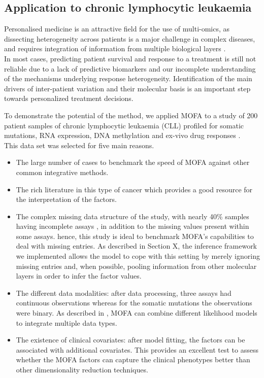 \subsection{Application to chronic lymphocytic leukaemia} \label{section:mofa_cll}
Personalised medicine is an attractive field for the use of multi-omics, as dissecting heterogeneity across patients is a major challenge in complex diseases, and requires integration of information from multiple biological layers \cite{Chen2013,Costello2014,Alyass2015}.\\
In most cases, predicting patient survival and response to a treatment is still not reliable due to a lack of predictive biomarkers and our incomplete understanding of the mechanisms underlying response heterogeneity. Identification of the main drivers of inter-patient variation and their molecular basis is an important step towards personalized treatment decisions. 

To demonstrate the potential of the method, we applied MOFA to a study of 200 patient samples of chronic lymphocytic leukaemia (CLL) profiled for somatic mutations, RNA expression, DNA methylation and ex-vivo drug responses\cite{Dietrich2018} .\\

This data set was selected for five main reasons. 
\begin{itemize}
	\item The large number of cases to benchmark the speed of MOFA against other common integrative methods.
	\item The rich literature in this type of cancer which provides a good resource for the interpretation of the factors.
	\item The complex missing data structure of the study, with nearly 40\% samples having incomplete assays , in addition to the missing values present within some assays. hence, this study is ideal to benchmark MOFA's capabilities to deal with missing entries. As described in Section X, the inference framework we implemented allows the model to cope with this setting by merely ignoring missing entries and, when possible, pooling information from other molecular layers in order to infer the factor values.
	\item The different data modalities: after data processing, three assays had continuous observations whereas for the somatic mutations the observations were binary. As described in , MOFA can combine different likelihood models to integrate multiple data types.
	\item The existence of clinical covariates: after model fitting, the factors can be associated with additional covariates. This provides an excellent test to assess whether the MOFA factors can capture the clinical phenotypes better than other dimensionality reduction techniques.
\end{itemize}


